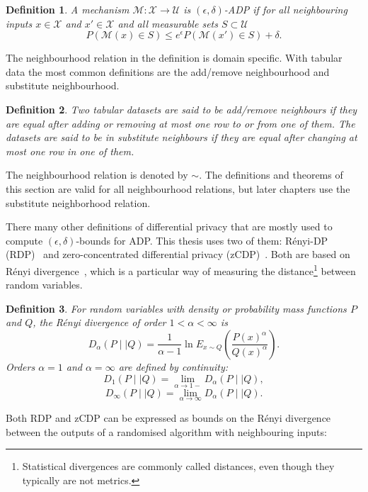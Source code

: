 \documentclass[english,twoside,openright]{HYgraduMLDS}
\newtheorem{definition}{Definition}
\newcommand{\dmid}{\mid\mid}
\newcommand{\calm}{{\mathcal{M}}}
\newcommand{\calx}{{\mathcal{X}}}
\newcommand{\calu}{{\mathcal{U}}}
\begin{document}
\begin{definition}\label{ADP-definition}
    A mechanism \(\calm\colon \calx \to \calu\) is \((\epsilon, \delta)\)-ADP if
    for all neighbouring inputs \(x\in \calx\) and \(x'\in \calx\) and 
    all measurable sets \(S \subset \calu\)
    \[
        P(\calm(x)\in S) \leq e^\epsilon P(\calm(x')\in S) + \delta.
    \]
\end{definition}

The neighbourhood relation in the definition is domain specific. With tabular 
data the most common definitions are the add/remove neighbourhood and 
substitute neighbourhood.
\begin{definition}
    Two tabular datasets are said to be add/remove neighbours if they are equal 
    after adding or removing at most one row to or from one of them. The datasets 
    are said to be in substitute neighbours if they are equal after 
    changing at most one row in one of them.
\end{definition}
The neighbourhood relation is denoted by \(\sim\). The definitions and 
theorems of this section are valid for all neighbourhood relations, but later
chapters use the substitute neighborhood relation.

There many other definitions of differential privacy that are mostly used
to compute \((\epsilon, \delta)\)-bounds for ADP. This thesis uses two of them: 
Rényi-DP (RDP)~\cite{Mironov17} and 
zero-concentrated differential privacy (zCDP)~\cite{BuS16}. Both are based 
on Rényi divergence~\cite{Mironov17}, which is a particular way of 
measuring the distance\footnote{
  Statistical divergences are commonly called distances, even though they
  typically are not metrics.
} between random variables.

\begin{definition}
    For random variables with density or probability mass functions 
    \(P\) and \(Q\), the Rényi divergence of order
    \(1 < \alpha < \infty\) is
    \[
        D_\alpha(P\dmid Q) = \frac{1}{\alpha - 1}\ln E_{x\sim Q}
        \left(\frac{P(x)^\alpha}{Q(x)^\alpha}\right).
    \]
    Orders \(\alpha = 1\) and \(\alpha = \infty\) are defined 
    by continuity:
    \[
        D_1(P\dmid Q) = \lim_{\alpha \to 1-} D_\alpha(P\dmid Q),
    \]
    \[
        D_\infty(P \dmid Q) = \lim_{\alpha\to \infty}D_\alpha(P\dmid Q).
    \]
\end{definition}

Both RDP and zCDP can be expressed as bounds on the
Rényi divergence between the outputs of a randomised algorithm with
neighbouring inputs:
\end{document}
